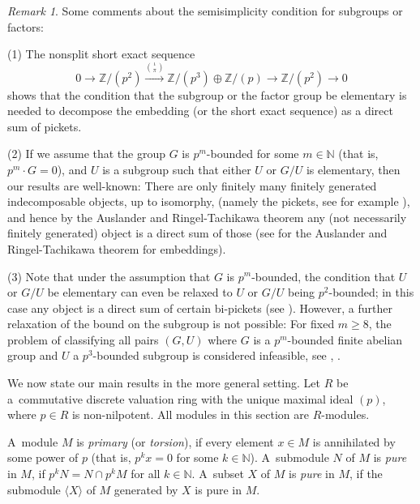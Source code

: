 \documentclass[twoside,leqno,12pt]{amsart}
\theoremstyle{definition}
\theoremstyle{remark}
\newtheorem{rem}[thm]{Remark}
\numberwithin{equation}{section}
\begin{document}
 \begin{rem}
   Some comments about the semisimplicity condition for subgroups or factors:

   (1) The nonsplit short exact sequence
    $$0\longrightarrow \mathbb Z/(p^2)\stackrel{{\iota\choose\pi}}\longrightarrow \mathbb Z/(p^3)\oplus
    \mathbb Z/(p)\longrightarrow \mathbb Z/(p^2)\longrightarrow 0$$
    shows that the condition that the subgroup or the factor group be
    elementary is needed
    to decompose the embedding (or the short exact sequence) as a direct sum of pickets.



    (2) If we assume that the group $G$ is $p^m$-bounded for some $m\in\mathbb N$
    (that is, $p^m\cdot G=0$),
    and $U$ is a subgroup such that either $U$ or $G/U$ is
    elementary, then our results are well-known:
      There are only
    finitely many finitely generated indecomposable objects, up to isomorphy,
    (namely the pickets, see for example \cite[3.1]{S}),
    and hence by the Auslander and Ringel-Tachikawa theorem any (not necessarily finitely generated) object
    is a direct sum of those (see \cite{M} for the Auslander and Ringel-Tachikawa theorem for embeddings).

    (3)
    Note that under the assumption that $G$ is $p^m$-bounded,
    the condition that $U$ or $G/U$ be elementary
    can even be relaxed to $U$ or $G/U$ being $p^2$-bounded; in this case any object is a direct sum of
    certain bi-pickets (see \cite[3.2]{S}).
    However, a further relaxation of the bound on the subgroup is not possible:
      For fixed $m\geq 8$,
      the problem of classifying all pairs $(G,U)$ where $G$ is a $p^m$-bounded finite abelian group
      and $U$ a $p^3$-bounded subgroup is considered infeasible, see \cite[3.7]{S}, \cite{RS}.
 \end{rem}

        We now state our main results in the more general setting.
      Let $R$ be a~commutative discrete valuation ring with the unique maximal ideal $(p)$, where $p\in R$ is non-nilpotent. All modules in this section are $R$-modules.

      A~module $M$ is {\it primary} (or {\it torsion}), if every element $x\in M$
      is annihilated by some power of $p$ (that is, $p^k x=0$ for some $k\in\mathbb N$).
      A~submodule $N$ of  $M$ is {\it pure} in $M$, if $p^kN=N\cap p^kM$
for all $k\in \mathbb{N}$.  A~subset $X$ of $M$ is {\it pure} in $M$, if the submodule $\langle X\rangle$ of $M$ generated by $X$ is pure in $M$.
 
\end{document}
